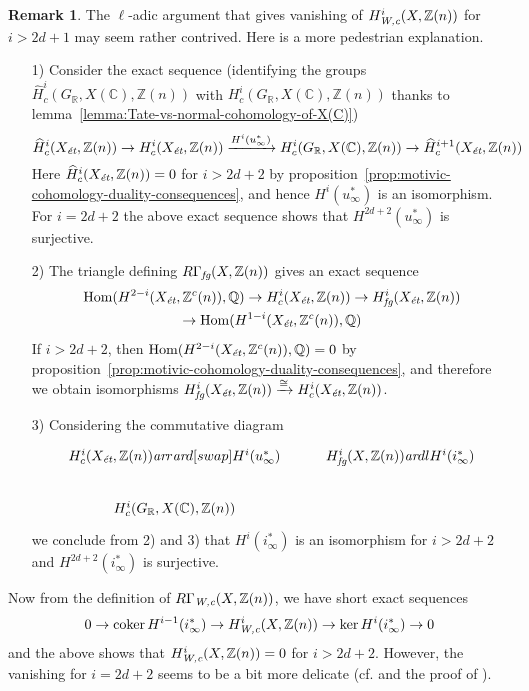 \documentclass[leqno,12pt]{article}
\theoremstyle{plain}
\theoremstyle{definition}
\newtheorem{remark}[theorem]{\indent\sc Remark}
\DeclareMathOperator{\Hom}{Hom}
\DeclareMathOperator{\coker}{coker}
\newcommand{\ZZ}{\mathbb{Z}}
\newcommand{\QQ}{\mathbb{Q}}
\newcommand{\RR}{\mathbb{R}}
\newcommand{\CC}{\mathbb{C}}
\newcommand{\Wc}{\text{\it W,c}}
\newcommand{\et}{\text{\it \'{e}t}}
\newcommand{\fg}{\text{\it fg}}
\newcommand{\ar}{\text{\it ar}}
\begin{document}
\begin{remark}
  The $\ell$-adic argument that gives vanishing of $H^i_\Wc (X, \ZZ(n))$ for
  $i > 2d+1$ may seem rather contrived. Here is a more pedestrian explanation.

  \begin{enumerate}
  \item[1)] Consider the exact sequence
    (identifying the groups
    $\widehat{H}^i_c (G_\RR, X (\CC), \ZZ (n))$ with
    $H^i_c (G_\RR, X (\CC), \ZZ (n))$
    thanks to lemma~\ref{lemma:Tate-vs-normal-cohomology-of-X(C)})
    \[ \widehat{H}^i_c (X_\et, \ZZ(n)) \to H^i_c (X_\et, \ZZ(n))
      \xrightarrow{H^i (u_\infty^*)} H^i_c (G_\RR, X (\CC), \ZZ (n)) \to
      \widehat{H}^{i+1}_c (X_\et, \ZZ(n)) \]
    Here $\widehat{H}^i_c (X_\et, \ZZ(n)) = 0$ for $i > 2d+2$
    by proposition~\ref{prop:motivic-cohomology-duality-consequences},
    and hence $H^i (u_\infty^*)$ is an isomorphism.
    For $i = 2d+2$ the above exact sequence shows that $H^{2d+2} (u_\infty^*)$
    is surjective.

  \item[2)] The triangle defining $R\Gamma_\fg (X, \ZZ(n))$ gives an exact sequence
    \begin{multline*}
      \Hom (H^{2-i} (X_\et, \ZZ^c (n)), \QQ) \to
      H^i_c (X_\et, \ZZ(n)) \to
      H^i_\fg (X_\et, \ZZ(n)) \\
      \to \Hom (H^{1-i} (X_\et, \ZZ^c (n)), \QQ)
    \end{multline*}
    If $i > 2d + 2$, then $\Hom (H^{2-i} (X_\et, \ZZ^c (n)), \QQ) = 0$ by
    proposition~\ref{prop:motivic-cohomology-duality-consequences}, and
    therefore we obtain isomorphisms
    $H^i_\fg (X_\et, \ZZ(n)) \xrightarrow{\cong} H^i_c (X_\et, \ZZ(n))$.

  \item[3)] Considering the commutative diagram
    \[ \begin{tikzcd}
        H^i_c (X_\et, \ZZ(n)) \ar{r}\ar{d}[swap]{H^i (u_\infty^*)} & H^i_\fg (X, \ZZ(n))\ar{dl}{H^i (i_\infty^*)} \\
        H^i_c (G_\RR, X (\CC), \ZZ (n))
      \end{tikzcd} \]
    we conclude from 2) and 3) that $H^i (i_\infty^*)$ is an isomorphism for
    $i > 2d+2$ and $H^{2d+2} (i_\infty^*)$ is surjective.
  \end{enumerate}

  Now from the definition of $R\Gamma_\Wc (X, \ZZ(n))$, we have short exact
  sequences
  \[ 0 \to \coker H^{i-1} (i_\infty^*) \to
    H^i_\Wc (X, \ZZ(n)) \to
    \ker H^i (i_\infty^*) \to 0 \]
  and the above shows that $H^i_\Wc (X, \ZZ(n)) = 0$ for $i > 2d+2$.
  However, the vanishing for $i = 2d+2$ seems to be a bit more delicate
  (cf. \cite[p.\,991]{Kahn-2003-equivalences} and the proof of
  \cite[Theorem~7.3]{Geisser-2004}).
\end{remark}
\end{document}
